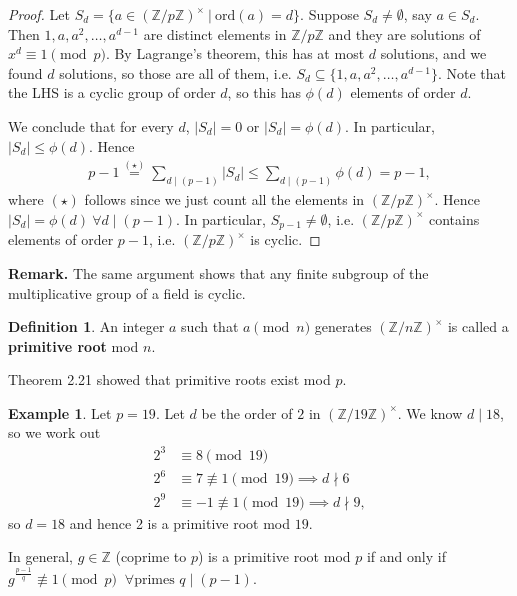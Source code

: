 \documentclass{article}
\theoremstyle{definition}
\newtheorem{example}[theorem]{Example}
\newtheorem{defn}[theorem]{Definition}
\theoremstyle{remark}
\begin{document}
\begin{proof}
    Let $S_d = \{a \in (\mathbb{Z}/p\mathbb{Z})^{\times} ~|~ \text{ord}(a) = d\}$. Suppose $S_d \neq \emptyset$, say $a \in S_d$. Then $1,a,a^2,\ldots,a^{d-1}$ are distinct elements in $\mathbb{Z}/p\mathbb{Z}$ and they are solutions of $x^d \equiv 1 \pmod{p}$. By Lagrange's theorem, this has at most $d$ solutions, and we found $d$ solutions, so those are all of them, i.e. $S_d \subseteq \{1,a,a^2,\ldots,a^{d-1}\}$. Note that the LHS is a cyclic group of order $d$, so this has $\phi(d)$ elements of order $d$.
    \vspace{1mm}
    
    We conclude that for every $d$, $|S_d| = 0$ or $|S_d| = \phi(d)$. In particular, ${|S_d| \le \phi(d)}$. Hence
    \begin{align*}
       p-1 \stackrel{(\star)}{=} \sum_{d \mid (p-1)}^{} |S_d| \le  \sum_{d \mid (p-1)}^{} \phi(d) = p-1,
    \end{align*}
    where $(\star)$ follows since we just count all the elements in $(\mathbb{Z}/p\mathbb{Z})^{\times}$. Hence ${|S_d| = \phi(d) ~\forall  d \mid (p-1)}$. In particular, $S_{p-1} \neq \emptyset$, i.e. $(\mathbb{Z}/p\mathbb{Z})^{\times}$ contains elements of order $p-1$, i.e. $(\mathbb{Z}/p\mathbb{Z})^{\times}$ is cyclic. 
\end{proof}
\textbf{Remark.} The same argument shows that any finite subgroup of the multiplicative group of a field is cyclic.
\begin{defn}
    An integer $a$ such that $a \pmod{n}$ generates $(\mathbb{Z}/n\mathbb{Z})^{\times}$ is called a \textbf{primitive root} mod $n$. 
\end{defn}
Theorem 2.21 showed that primitive roots exist mod $p$.
\begin{example}
    Let $p = 19$. Let $d$ be the order of $2$ in $(\mathbb{Z}/19\mathbb{Z})^{\times}$. We know $d \mid 18$, so we work out 
    \begin{align*}
        2^3 &\equiv 8 \pmod{19}\\
        2^6 &\equiv 7 \not\equiv 1 \pmod{19} \implies d \nmid 6\\
        2^9 &\equiv -1 \not\equiv 1 \pmod{19} \implies d \nmid 9,
    \end{align*}
    so $d=18$ and hence 2 is a primitive root mod $19$.
\end{example}
In general, $g \in \mathbb{Z}$ (coprime to $p$) is a primitive root mod $p$ if and only if $g^{\frac{p-1}{q}} \not\equiv 1 \pmod{p}$ $~\forall \text{primes }q \mid (p-1)$.
\end{document}
